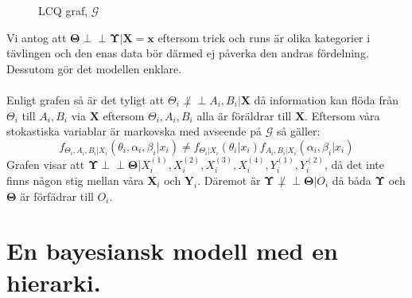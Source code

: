 \documentclass{article}
\newcommand{\independent}{\perp\!\!\!\!\perp}
\begin{document}
\begin{figure}[h]
    \centering
    \caption{LCQ graf, $\mathcal{G}$}
    \label{fig:hierarki}
\end{figure}
Vi antog att $\mathbf{\Theta} \independent \mathbf{\Upsilon} | \mathbf{X} = \mathbf{x}$ eftersom trick och runs är olika kategorier i tävlingen och den enas data bör därmed ej påverka den andras fördelning.
Dessutom gör det modellen enklare.
\\\\
Enligt grafen så är det tyligt att $\Theta_i \not\independent A_i, B_i | \mathbf{X}$ då information kan flöda från $\Theta_i$ till $A_i, B_i$ via $\mathbf{X}$ eftersom $\Theta_i, A_i, B_i$ alla är föräldrar till $\mathbf{X}$.
Eftersom våra stokastiska variablar är markovska med avseende på $\mathcal{G}$ så gäller:
\[
    f_{\Theta_i, A_i, B_i | X_i}(\theta_i, \alpha_i, \beta_i | x_i) \neq f_{\Theta_i | X_i}(\theta_i | x_i)f_{A_i, B_i | X_i}(\alpha_i, \beta_i | x_i)
\]
Grafen visar att $\mathbf{\Upsilon} \independent \mathbf{\Theta} | X_i^{(1)}, X_i^{(2)}, X_i^{(3)}, X_i^{(4)}, Y_i^{(1)}, Y_i^{(2)}$, då det inte finns någon stig mellan våra $\mathbf{X}_i$ och $\mathbf{Y}_i$.
Däremot är $\mathbf{\Upsilon} \not\independent \mathbf{\Theta} | O_i$ då båda $\mathbf{\Upsilon}$ och $\mathbf{\Theta}$ är förfädrar till $O_i$.

\newpage
\section{En bayesiansk modell med en hierarki.}
\end{document}
